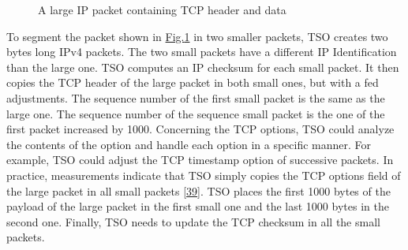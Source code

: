 \documentclass[letterpaper,10pt,english]{sphinxmanual}
\begin{document}
\begin{figure}[htbp]
\caption{A large IP packet containing TCP header and data}\label{\detokenize{mptcp:id82}}\label{\detokenize{mptcp:fig-mptcp-tso}}\end{figure}
\sphinxAtStartPar
To segment the packet shown in \hyperref[\detokenize{mptcp:fig-mptcp-tso}]{Fig.\@ \ref{\detokenize{mptcp:fig-mptcp-tso}}} in two smaller packets, TSO creates two  bytes long IPv4 packets. The two small packets have a different IP Identification than the large one. TSO computes an IP checksum for each small packet. It then copies the TCP header of the large packet in both small ones, but with a fed adjustments. The sequence number of the  first small packet is the same as the large one. The sequence number of the sequence small packet is the one of the first packet increased by 1000.
Concerning the TCP options, TSO could analyze the contents of the option and handle each option in a specific manner. For example, TSO could adjust the TCP timestamp option of successive packets. In practice, measurements indicate that TSO simply copies the TCP options field of the large packet in all small packets {[}\hyperlink{cite.biblio:id8938}{39}{]}. TSO places the first 1000 bytes of the payload of the large packet in the first small one and the last 1000 bytes in the second one. Finally, TSO needs to update the TCP checksum in all the small packets.
\end{document}

